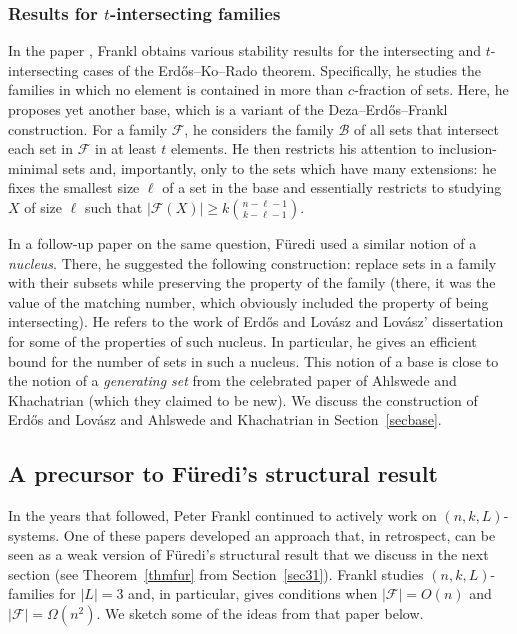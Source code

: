 \documentclass[graybox]{svmult}
\renewcommand{\ge}{\geqslant}
\newcommand{\ff}{\mathcal{F}}
\newcommand{\m}{\mathcal}
\begin{document}
\subsubsection{Results for $t$-intersecting families} In the paper \cite{Fra2}, Frankl obtains various stability results for the intersecting and $t$-intersecting cases of the Erd\H os--Ko--Rado theorem. Specifically, he studies the families in which no element is contained in more than $c$-fraction of sets. Here, he proposes yet another base, which is a variant of the Deza--Erd\H os--Frankl construction. For a family $\ff$, he considers the family $\m B$ of all sets that intersect each set in $\ff$ in at least $t$ elements. He then restricts his attention to inclusion-minimal sets and, importantly, only to the sets which have many extensions: he fixes the smallest size $\ell$ of a set in the base and essentially restricts to studying $X$ of size $\ell$ such that $|\ff(X)|\ge k{n-\ell-1\choose k-\ell-1}$.

In a follow-up paper \cite{Fur78} on the same question, F\"uredi used a similar notion of a {\it nucleus}. There, he suggested the following construction: replace sets in a family with their subsets while preserving the property of the family (there, it was the value of the matching number, which obviously included the property of being intersecting). He refers to the work of Erd\H os and Lov\'asz \cite{EL} and Lov\'asz' dissertation for some of the properties of such nucleus. In particular, he gives an efficient bound for the number of sets in such a nucleus. This notion of a base is close to the notion of a {\em generating set} from the celebrated paper of Ahlswede and Khachatrian \cite{AK} (which they claimed to be new).  We discuss the construction of Erd\H os and Lov\'asz and Ahlswede and Khachatrian in Section~\ref{secbase}.

\subsection{A precursor to F\"uredi's structural result}\label{sec25}
In the years that followed, Peter Frankl continued to actively work on $(n,k,L)$-systems. One of these papers \cite{Fra83} developed an approach that, in retrospect, can be seen as a weak version of F\"uredi's structural result that we discuss in the next section (see Theorem~\ref{thmfur} from Section~\ref{sec31}). Frankl studies $(n,k,L)$-families for $|L|=3$ and, in particular, gives conditions when $|\ff| = O(n)$ and $|\ff| = \Omega(n^2)$. We sketch some of the ideas from that paper below.
\end{document}
